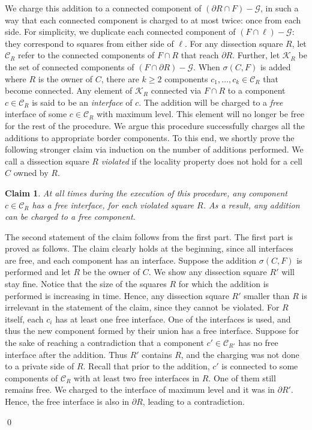 \documentclass[extras,11pt]{article} \usepackage{fullpage}
\theoremstyle{mytheorem}
\newtheorem{claim}[theorem]{Claim}
\newenvironment{proofof}[1]{\par\noindent{\bf #1.}\hspace{0.5em}}
    {\hfill\qed\vspace{1ex}}
\newcommand{\K}{\mathcal{K}}
\newcommand{\C}{\mathcal{C}}
\newcommand{\G}{\mathcal{G}}
\begin{document}
\begin{proofof}{\proofname\ of Theorem~\ref{thm:locality}}
We charge this addition to a connected component of $(\partial R\cap  F)-\G$,
 in such a way that each connected component is charged to at most twice: once from each side.
For simplicity, we duplicate each connected component of $(F\cap\ell)-\G$: they correspond to squares from either side of $\ell$.
For any dissection square $R$, let  $\mathcal{C}_{R}$ refer to the connected components of $F\cap R$ that reach $\partial R$.
Further, let $\mathcal{K}_R$ be the set of connected components of $(F\cap\partial R)-\G$.
When $\sigma(C,F)$ is  added where $R$ is the owner of $C$,
there are $k\geq 2$ components $c_1, \dots, c_k\in\C_R$ that become connected.
Any element of $\K_R$ connected via $F\cap R$ to a component $c\in\C_R$
is said to be an \emph{interface} of $c$.
The addition will be charged to a \emph{free} interface of some $c\in\C_R$
with maximum level. This element will no longer be free
for the rest of the procedure.
We argue this procedure  successfully charges all the additions to appropriate border components.
To this end, we shortly prove the following stronger claim via induction on the number of additions performed.
We call a dissection square $R$ \emph{violated} if the locality property does not hold for a cell $C$ owned by $R$.
\begin{claim}\label{clm:cij}
At all times during the execution of this procedure,
any component $c\in\C_R$ has a free interface,
for each violated square $R$.
As a result, any addition can be charged to a free component.
\end{claim}
The second statement of the claim follows from the first part.
The first part is proved as follows.
The claim clearly holds at the beginning, 
since all interfaces are free, and each component has an interface.
Suppose the addition $\sigma(C,F)$ is performed and let $R$ be the owner of $C$.
We show any dissection square $R'$ will stay fine.
Notice that the size of the squares $R$ for which the addition is performed is increasing in time.
Hence, any dissection square $R'$ smaller than $R$ is irrelevant in the statement of the claim, since they cannot be violated.
For $R$ itself, each $c_i$ has at least one free interface.
One of the interfaces is used, and thus the new component formed by their union has a free interface.
Suppose for the sake of reaching a contradiction that
a component $c'\in\C_{R'}$ has no free interface after the addition.
Thus $R'$  contains $R$,
and the charging was not done to a private side of $R$.
Recall that prior to the addition, $c'$ is connected to some components of $\C_R$ with at least two free interfaces in $R$.
One of them still remains free.
We charged to the interface of maximum level and it was in $\partial R'$.
Hence, the free interface is also in $\partial R$, leading to a contradiction.


\end{proofof}
\end{document}
